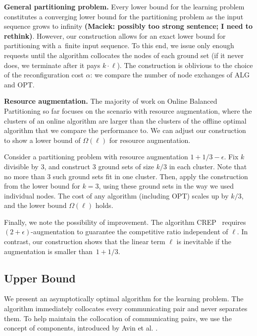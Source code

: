 \documentclass[a4paper,anonymous,USenglish]{lipics-v2019}
\newcommand{\OPT}{\textsc{OPT}\xspace}
\newcommand{\ALG}{\textsc{ALG}\xspace}
\newcommand\maciek[1]{\color{brown}\textbf{(Maciek: #1)}\color{black}}
\begin{document}
\noindent
\textbf{General partitioning problem.}
Every lower bound for the learning problem constitutes a converging lower bound for the partitioning problem as the input sequence grows to infinity \maciek{possibly too strong sentence; I need to rethink}.
However, our construction allows for an exact lower bound for partitioning with a~finite input sequence.
To this end, we issue only enough requests until the algorithm collocates the nodes of each ground set (if it never does, we terminate after it pays $k\cdot \ell$).
The construction is oblivious to the choice of the reconfiguration cost $\alpha$: we compare the 	number of node exchanges of \ALG and \OPT.



\noindent
\textbf{Resource augmentation.}
The majority of work on Online Balanced Partitioning so far \cite{repartition-disc,sigmetrics19_partitioning} focuses on the scenario with resource augmentation, where the clusters of an online algorithm are larger than the clusters of the offline optimal algorithm that we compare the performance to.
We can adjust our construction to show a lower bound of $\Omega(\ell)$ for resource augmentation.

Consider a partitioning problem with resource augmentation $1+1/3-\epsilon$.
Fix $k$ divisible by $3$, and construct $3$ ground sets of size $k/3$ in each cluster.
Note that no more than $3$ such ground sets fit in one cluster.
Then, apply the construction from the lower bound for $k=3$, using these ground sets in the way we used individual nodes.
The cost of any algorithm (including \OPT) scales up by $k/3$, and the lower bound $\Omega(\ell)$ holds.

Finally, we note the possibility of improvement. The algorithm CREP~\cite{repartition-disc} requires $(2+\epsilon)$-augmentation to guarantee the competitive ratio independent of $\ell$.
In contrast, our construction shows that the linear term $\ell$ is inevitable if the augmentation is smaller than~$1+1/3$.

\subsection{Upper Bound}
\label{sec:ppl}

We present an asymptotically optimal algorithm for the learning problem.
The algorithm immediately collocates every communicating pair and never separates them.
To help maintain the collocation of communicating pairs, we use the concept of components, introduced by Avin et al. \cite{repartition-disc}.
\end{document}
